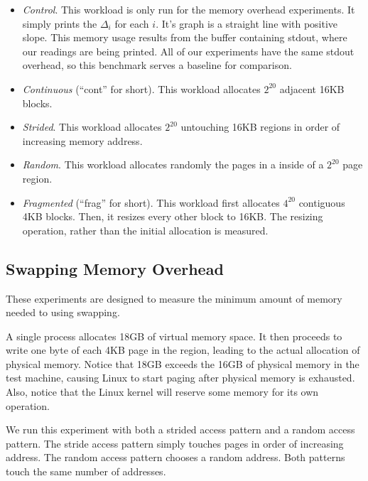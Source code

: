 \documentclass[twocolumn,11pt]{article}
\begin{document}
\begin{itemize} \item \textit{Control}. This workload is only run for the memory
overhead experiments. It simply prints the $\Delta_i$ for each $i$. It's graph
is a straight line with positive slope. This memory usage results from the
buffer containing stdout, where our readings are being printed. All of our
experiments have the same stdout overhead, so this benchmark serves a baseline
for comparison.

\item \textit{Continuous} (``cont'' for short). This workload allocates $2^{20}$
adjacent 16KB blocks.

\item \textit{Strided}. This workload allocates $2^{20}$ untouching 16KB regions
in order of increasing memory address.

\item \textit{Random}. This workload allocates randomly the pages in a
inside of a $2^{20}$ page region.

\item \textit{Fragmented} (``frag'' for short). This workload first allocates
    $4^{20}$ contiguous 4KB blocks. Then, it resizes every other block to 16KB.
        The resizing operation, rather than the initial allocation is measured.
\end{itemize}

\subsection{Swapping Memory Overhead}
\label{swapping_memory_overhead}

These experiments are designed to measure the minimum amount of memory needed
to using swapping.

A single process allocates 18GB of virtual memory space. It then proceeds to
write one byte of each 4KB page in the region, leading to the actual allocation
of physical memory. Notice that 18GB exceeds the 16GB of physical memory in the
test machine, causing Linux to start paging after physical memory is exhausted.
Also, notice that the Linux kernel will reserve some memory for its own
operation.

We run this experiment with both a strided access pattern and a random access
pattern. The stride access pattern simply touches pages in order of increasing
address. The random access pattern chooses a random address. Both patterns touch
the same number of addresses.
\end{document}
